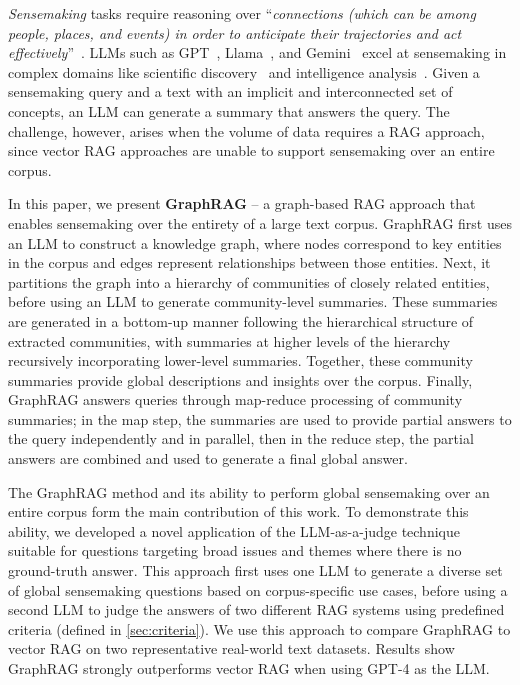 \documentclass{article}
\begin{document}
\textit{Sensemaking} tasks require reasoning over ``\emph{connections
(which can be among people, places, and events) in order to anticipate their trajectories and act effectively}''~\citep{klein2006amaking}.
LLMs such as GPT~\citep{brown2020language, achiam2023gpt}, Llama~\citep{touvron2023llama}, and Gemini~\citep{team2023gemini} excel at sensemaking in complex domains like scientific discovery~\citep{ai4science2023impact} and intelligence analysis~\citep{ranade2023fabula}.
Given a sensemaking query and a text with an implicit and interconnected set of concepts, an LLM can generate a summary that answers the query.
The challenge, however, arises when the volume of data requires a RAG approach, since vector RAG approaches are unable to support sensemaking over an entire corpus.

In this paper, we present \textbf{GraphRAG} -- a graph-based RAG approach that enables sensemaking over the entirety of a large text corpus.
GraphRAG first uses an LLM to construct a knowledge graph, where nodes correspond to key entities in the corpus and edges represent relationships between those entities. 
Next, it partitions the graph into a hierarchy of communities of closely related entities, before using an LLM to generate community-level summaries. These summaries are generated in a bottom-up manner following the hierarchical structure of extracted communities, with summaries at higher levels of the hierarchy recursively incorporating lower-level summaries.
Together, these community summaries provide global descriptions and insights over the corpus.
Finally, GraphRAG answers queries through map-reduce processing of community summaries; in the map step, the summaries are used to provide partial answers to the query independently and in parallel, then in the reduce step, the partial answers are combined and used to generate a final global answer.

The GraphRAG method and its ability to perform global sensemaking over an entire corpus form the main contribution of this work. To demonstrate this ability, we developed a novel application of the LLM-as-a-judge technique ~\citep{zheng2024judging} suitable for questions targeting broad issues and themes where there is no ground-truth answer.
This approach first uses one LLM to generate a diverse set of global sensemaking questions based on corpus-specific use cases, before using a second LLM to judge the answers of two different RAG systems using predefined criteria (defined in \autoref{sec:criteria}).
We use this approach to compare GraphRAG to vector RAG on two representative real-world text datasets.
Results show GraphRAG strongly outperforms vector RAG when using GPT-4 as the LLM.
\end{document}
